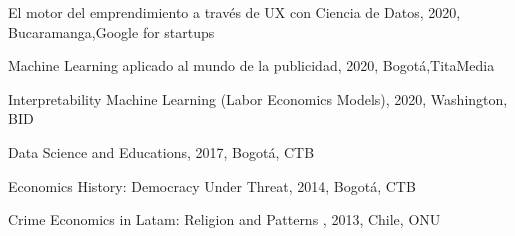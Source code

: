 
\begin{cventries}

\begin{cvitems}
\item {El motor del emprendimiento a través de UX con Ciencia de Datos, 2020, Bucaramanga,Google for startups}
\item {Machine Learning aplicado al mundo de la publicidad, 2020, Bogotá,TitaMedia}
\item {Interpretability Machine Learning (Labor Economics Models), 2020, Washington, BID}
\item {Data Science and Educations, 2017, Bogotá, CTB}
\item {Economics History: Democracy Under Threat, 2014, Bogotá, CTB}
\item {Crime Economics in Latam: Religion and Patterns , 2013, Chile, ONU}
\end{cvitems}

\end{cventries}
